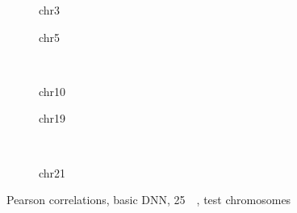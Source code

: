 \begin{figure}[p]
    \begin{subfigure}{0.45\textwidth}
        \scriptsize
        \caption{chr3}
    \end{subfigure} \hfill
    \begin{subfigure}{0.45\textwidth}
        \scriptsize
        \caption{chr5}
    \end{subfigure}\\[5mm]
    \begin{subfigure}{0.45\textwidth}
        \scriptsize
        \caption{chr10}
    \end{subfigure}\hfill
    \begin{subfigure}{0.45\textwidth}
        \scriptsize
        \caption{chr19}
    \end{subfigure}\\[3mm]
    \centering
    \begin{subfigure}{0.45\textwidth}
        \scriptsize
        \caption{chr21}
    \end{subfigure}
    \caption{Pearson correlations, basic DNN, \SI{25}{\kilo\bp}, test chromosomes}
    \label{fig:results:basicDNN_pearson}
\end{figure}

